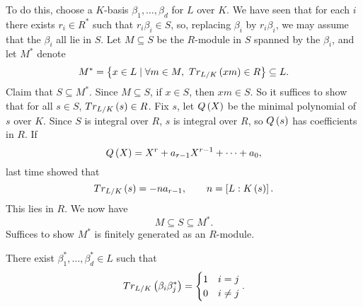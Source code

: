 
To do this, choose a $ K $-basis $ \beta_1, \dots, \beta_d $ for $ L $ over $ K $. We have seen that for each $ i $ there exists $ r_i \in R^* $ such that $ r_i\beta_i \in S $, so, replacing $ \beta_i $ by $ r_i\beta_i $, we may assume that the $ \beta_i $ all lie in $ S $. Let $ M \subseteq S $ be the $ R $-module in $ S $ spanned by the $ \beta_i $, and let $ M^* $ denote
$$ M^* = \left\{ x \in L \mid \forall m \in M, \ Tr_{L / K}\left( xm \right) \in R \right\} \subseteq L. $$
Claim that $ S \subseteq M^* $. Since $ M \subseteq S $, if $ x \in S $, then $ xm \in S $. So it suffices to show that for all $ s \in S $, $ Tr_{L / K}\left( s \right) \in R $. Fix $ s $, let $ Q\left( X \right) $ be the minimal polynomial of $ s $ over $ K $. Since $ S $ is integral over $ R $, $ s $ is integral over $ R $, so $ Q\left( s \right) $ has coefficients in $ R $. If
$$ Q\left( X \right) = X^r + a_{r - 1}X^{r - 1} + \dots + a_0, $$
last time showed that
$$ Tr_{L / K}\left( s \right) = -na_{r - 1}, \qquad n = \left[ L : K\left( s \right) \right]. $$
This lies in $ R $. We now have
$$ M \subseteq S \subseteq M^*. $$
Suffices to show $ M^* $ is finitely generated as an $ R $-module.

\begin{proposition}
There exist $ \beta_1^*, \dots, \beta_d^* \in L $ such that
$$ Tr_{L / K}\left( \beta_i\beta_j^* \right) =
\begin{cases}
1 & i = j \\
0 & i \ne j
\end{cases}.
$$
\end{proposition}

